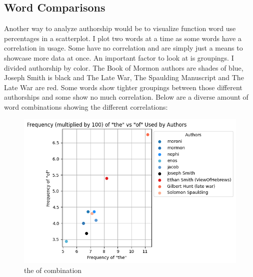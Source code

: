 \documentclass[
  letterpaper,
  DIV=11,
  numbers=noendperiod]{scrartcl}
\begin{document}
\hypertarget{word-comparisons}{%
\subsection{\texorpdfstring{\textbf{Word
Comparisons}}{Word Comparisons}}\label{word-comparisons}}

Another way to analyze authorship would be to visualize function word
use percentages in a scatterplot. I plot two words at a time as some
words have a correlation in usage. Some have no correlation and are
simply just a means to showcase more data at once. An important factor
to look at is groupings. I divided authorship by color. The Book of
Mormon authors are shades of blue, Joseph Smith is black and The Late
War, The Spaulding Manuscript and The Late War are red. Some words show
tighter groupings between those different authorships and some show no
much correlation. Below are a diverse amount of word combinations
showing the different correlations:

\begin{figure}

{\centering \includegraphics{Graphs/Word Comparisons/the_of_output.png}

}

\caption{the of combination}

\end{figure}
\end{document}
